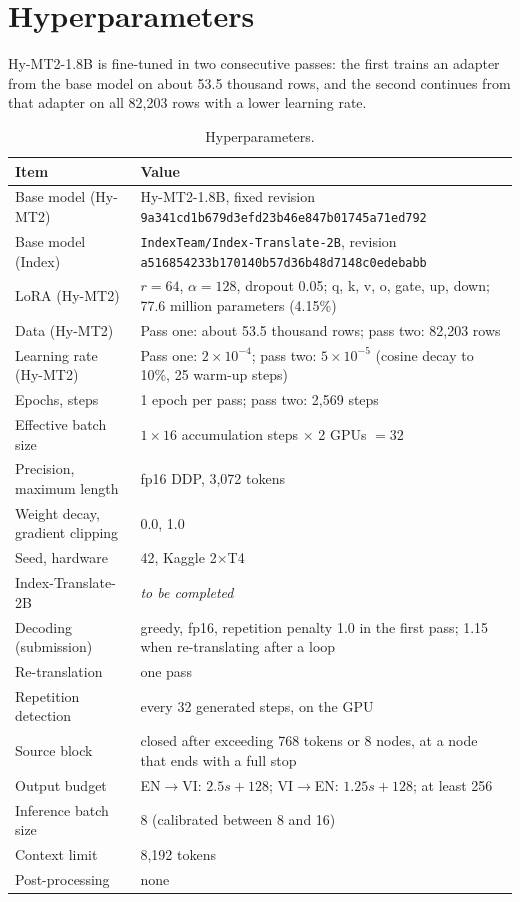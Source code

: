 \documentclass[conference]{IEEEtran}
\newcommand{\envi}{EN$\rightarrow$VI}
\newcommand{\vien}{VI$\rightarrow$EN}
\begin{document}
\section{Hyperparameters}\label{app:hyper}
Hy-MT2-1.8B is fine-tuned in two consecutive passes: the first trains an adapter from the base model on about 53.5 thousand rows, and the second continues from that adapter on all 82,203 rows with a lower learning rate.

\begin{table}[t]
\caption{Hyperparameters.}
\label{tab:hyper}
\centering
\footnotesize
\begin{tabular}{p{}p{}}
\toprule
Item & Value \\
\midrule
Base model (Hy-MT2) & Hy-MT2-1.8B, fixed revision \texttt{9a341cd1b679d3efd23b\allowbreak 46e847b01745a71ed792} \\
Base model (Index) & \texttt{IndexTeam/Index-Translate-2B}, revision \texttt{a516854233b170140b57\allowbreak d36b48d7148c0edebabb} \\
LoRA (Hy-MT2) & $r=64$, $\alpha=128$, dropout 0.05; q, k, v, o, gate, up, down; 77.6 million parameters (4.15\%) \\
Data (Hy-MT2) & Pass one: about 53.5 thousand rows; pass two: 82,203 rows \\
Learning rate (Hy-MT2) & Pass one: $2\times10^{-4}$; pass two: $5\times10^{-5}$ (cosine decay to 10\%, 25 warm-up steps) \\
Epochs, steps & 1 epoch per pass; pass two: 2,569 steps \\
Effective batch size & $1 \times 16$ accumulation steps $\times$ 2 GPUs $= 32$ \\
Precision, maximum length & fp16 DDP, 3,072 tokens \\
Weight decay, gradient clipping & 0.0, 1.0 \\
Seed, hardware & 42, Kaggle 2$\times$T4 \\
Index-Translate-2B & \emph{to be completed} \\
Decoding (submission) & greedy, fp16, repetition penalty 1.0 in the first pass; 1.15 when re-translating after a loop \\
Re-translation & one pass \\
Repetition detection & every 32 generated steps, on the GPU \\
Source block & closed after exceeding 768 tokens or 8 nodes, at a node that ends with a full stop \\
Output budget & \envi{}: $2.5 s + 128$; \vien{}: $1.25 s + 128$; at least 256 \\
Inference batch size & 8 (calibrated between 8 and 16) \\
Context limit & 8,192 tokens \\
Post-processing & none \\
\bottomrule
\end{tabular}
\end{table}
\end{document}
